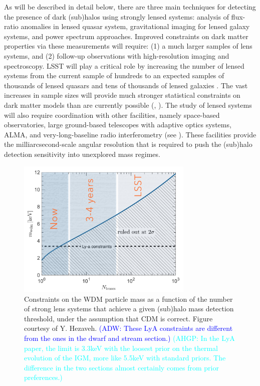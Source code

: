 \documentclass[modern,linenumbers]{aastex62}
\newcommand{\Comment}[3]{\textcolor{#1}{(#2: #3)}}
\newcommand{\ADW}[1]{\Comment{blue}{ADW}{#1}} %
\newcommand{\AHGP}[1]{\Comment{cyan}{AHGP}{#1}} %
\begin{document}
As will be described in detail below, there are three main techniques for detecting the presence of dark (sub)halos using strongly lensed systems: analysis of flux-ratio anomalies in lensed quasar system,
gravitational imaging for lensed galaxy systems, and power spectrum approaches. 
Improved constraints on dark matter properties via these measurements will require: (1) a much larger samples of lens systems, and (2) follow-up observations with high-resolution imaging and spectroscopy.
LSST will play a critical role by increasing the number of lensed systems from the current sample of hundreds to an expected samples of thousands of lensed quasars \citep{O+M10} and tens of thousands of lensed galaxies \citep{Collett2015}.
The vast increases in sample sizes will provide much stronger statistical constraints on dark matter models than are currently possible (\eg, ).
The study of lensed systems will also require coordination with other facilities, namely space-based observatories, large ground-based telescopes with adaptive optics systems, ALMA, and very-long-baseline radio interferometry (see ). These facilities provide the milliarcsecond-scale angular resolution that is required to push the (sub)halo detection sensitivity into unexplored mass regimes.

\begin{figure}
    \centering
    \includegraphics[width=0.75\textwidth]{figures/wdm_constraints_yh.jpg}
    \caption{Constraints on the WDM particle mass as a function of the number of strong lens systems that achieve a given (sub)halo mass detection threshold, under the assumption that CDM is correct.  Figure courtesy of Y. Hezaveh. \ADW{These LyA constraints are different from the ones in the dwarf and stream section.} \AHGP{In the LyA paper, the limit is 3.3keV with the loosest prior on the thermal evolution of the IGM, more like 5.5keV with standard priors. The difference in the two sections almost certainly comes from prior preferences.}}
    \label{fig:lensing_wdmlim_vs_nlens}
\end{figure}
\end{document}

